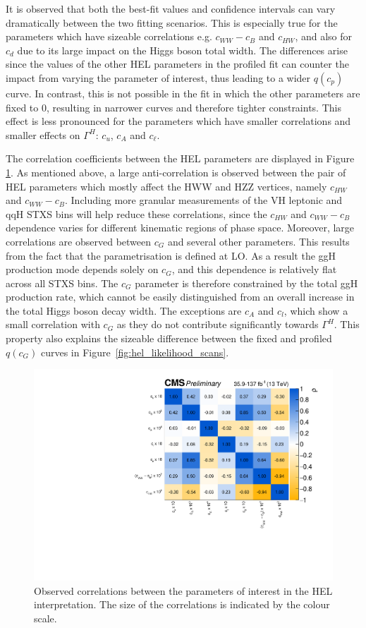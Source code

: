 It is observed that both the best-fit values and confidence intervals can vary dramatically between the two fitting scenarios. This is especially true for the parameters which have sizeable correlations e.g. $c_{WW}-c_B$ and $c_{HW}$, and also for $c_d$ due to its large impact on the Higgs boson total width. The differences arise since the values of the other HEL parameters in the profiled fit can counter the impact from varying the parameter of interest, thus leading to a wider $q(c_p)$ curve. In contrast, this is not possible in the fit in which the other parameters are fixed to 0, resulting in narrower curves and therefore tighter constraints. This effect is less pronounced for the parameters which have smaller correlations and smaller effects on $\Gamma^H$: $c_u$, $c_A$ and $c_\ell$. 

The correlation coefficients between the HEL parameters are displayed in Figure \ref{fig:hel_correlations}. As mentioned above, a large anti-correlation is observed between the pair of HEL parameters which mostly affect the HWW and HZZ vertices, namely $c_{HW}$ and $c_{WW}-c_B$. Including more granular measurements of the VH leptonic and qqH STXS bins will help reduce these correlations, since the $c_{HW}$ and $c_{WW}-c_B$ dependence varies for different kinematic regions of phase space. Moreover, large correlations are observed between $c_G$ and several other parameters. This results from the fact that the parametrisation is defined at LO. As a result the ggH production mode depends solely on $c_G$, and this dependence is relatively flat across all STXS bins. The $c_G$ parameter is therefore constrained by the total ggH production rate, which cannot be easily distinguished from an overall increase in the total Higgs boson decay width. The exceptions are $c_A$ and $c_l$, which show a small correlation with $c_G$ as they do not contribute significantly towards $\Gamma^H$. This property also explains the sizeable difference between the fixed and profiled $q(c_G)$ curves in Figure~\ref{fig:hel_likelihood_scans}.

\begin{figure}[htbp]
  \centering
  \includegraphics[width=.8\textwidth]{Figures/eft/hel_correlations.pdf}
  \caption[Correlations in HEL parameters]
  {
    Observed correlations between the parameters of interest in the HEL interpretation. The size of the correlations is indicated by the colour scale.
  }
  \label{fig:hel_correlations}
\end{figure}


